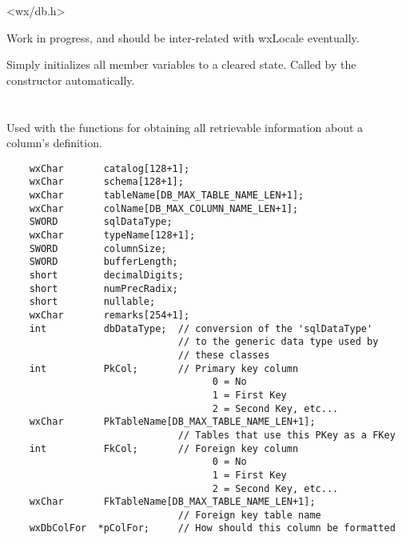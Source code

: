 <wx/db.h>


\label{wxdbcolforformat}

\label{wxdbcolforformat}

Work in progress, and should be inter-related with wxLocale eventually.

\label{wxdbcolforinitialize}

Simply initializes all member variables to a cleared state.  Called by
the constructor automatically.

\section{}\label{wxdbcolinf}

Used with the  functions for obtaining all retrievable information about a column's definition.

\begin{verbatim}
    wxChar       catalog[128+1];
    wxChar       schema[128+1];
    wxChar       tableName[DB_MAX_TABLE_NAME_LEN+1];
    wxChar       colName[DB_MAX_COLUMN_NAME_LEN+1];
    SWORD        sqlDataType;
    wxChar       typeName[128+1];
    SWORD        columnSize;
    SWORD        bufferLength;
    short        decimalDigits;
    short        numPrecRadix;
    short        nullable;
    wxChar       remarks[254+1];
    int          dbDataType;  // conversion of the 'sqlDataType'
                              // to the generic data type used by
                              // these classes
    int          PkCol;       // Primary key column
                                    0 = No
                                    1 = First Key
                                    2 = Second Key, etc...
    wxChar       PkTableName[DB_MAX_TABLE_NAME_LEN+1];
                              // Tables that use this PKey as a FKey
    int          FkCol;       // Foreign key column
                                    0 = No
                                    1 = First Key
                                    2 = Second Key, etc...
    wxChar       FkTableName[DB_MAX_TABLE_NAME_LEN+1];
                              // Foreign key table name
    wxDbColFor  *pColFor;     // How should this column be formatted
\end{verbatim}

